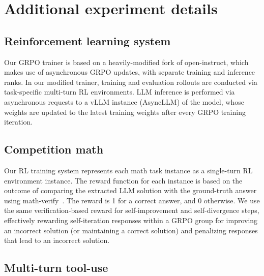\documentclass[10pt]{article} %
\begin{document}



\newpage

\appendix

\section{Additional experiment details}
\label{app:exp_details}

\subsection{Reinforcement learning system}
\label{app:rl_system}
Our GRPO trainer is based on a heavily-modified fork of open-instruct, which makes use of asynchronous GRPO updates, with separate training and inference ranks. In our modified trainer, training and evaluation rollouts are conducted via task-specific multi-turn RL environments. LLM inference is performed via asynchronous requests to a vLLM instance (AsyncLLM) of the model, whose weights are updated to the latest training weights after every GRPO training iteration. 

\subsection{Competition math}
\label{app:exp_details_math}
Our RL training system represents each math task instance as a single-turn RL environment instance. The reward function for each instance is based on the outcome of comparing the extracted LLM solution with the ground-truth answer using math-verify~\citep{math-verify}. The reward is 1 for a correct answer, and 0 otherwise. We use the same verification-based reward for self-improvement and self-divergence steps, effectively rewarding self-iteration responses within a GRPO group for improving an incorrect solution (or maintaining a correct solution) and penalizing responses that lead to an incorrect solution. 

\subsection{Multi-turn tool-use}
\label{app:exp_details_bfcl}
\end{document}
